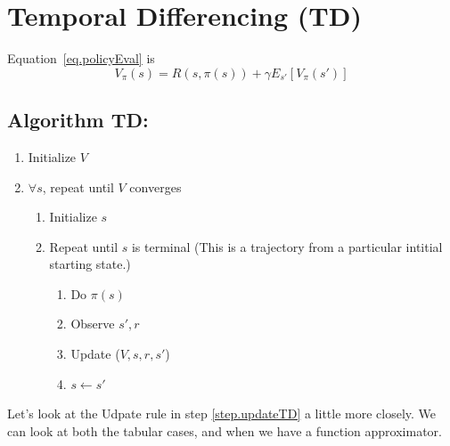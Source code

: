 \documentclass[11pt]{article}
\numberwithin{equation}{section}
\numberwithin{figure}{section}
\begin{document}
\section{Temporal Differencing (TD)}
Equation~\ref{eq.policyEval} is 
\begin{equation}
	V_\pi(s) = R(s,\pi(s)) + \gamma E_{s'}[V_\pi(s')]
	\label{eq.policyEval}
\end{equation}

\subsection*{Algorithm TD:}

\begin{enumerate}
	\item Initialize $V$
	\item $\forall s$, repeat until $V$ converges
	\begin{enumerate}
		\item Initialize $s$
		\item Repeat until $s$ is terminal (This is a trajectory from a particular intitial starting state.)
		\begin{enumerate}
			\item Do $\pi(s)$
			\item Observe $s', r$
			\item Update ($V, s, r, s'$)
			\label{step.updateTD}
			\item $s \leftarrow s'$
		\end{enumerate}		
	\end{enumerate}		
\end{enumerate}		

Let's look at the Udpate rule in step \ref{step.updateTD} a little more closely.  We can look at both the tabular cases, and when we have a function approximator.

\end{document}
